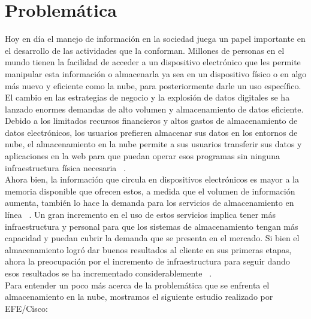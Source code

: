 \section{Problemática}
Hoy en día el manejo de información en la sociedad juega un papel importante en el desarrollo de las actividades que la conforman. Millones de personas en el mundo tienen la facilidad de acceder a un dispositivo electrónico que les permite manipular esta información o almacenarla ya sea en un dispositivo físico o en algo más nuevo y eficiente como la nube, para posteriormente darle un uso específico.
El cambio en las estrategias de negocio y la explosión de datos digitales se ha lanzado enormes demandas de alto volumen y almacenamiento de datos eficiente. Debido a los limitados recursos financieros y altos gastos de almacenamiento de datos electrónicos, los usuarios prefieren almacenar sus datos en los entornos de nube, el almacenamiento en la nube permite a sus usuarios transferir sus datos y aplicaciones en la web para que puedan operar esos programas sin ninguna infraestructura física necesaria ~\cite{Keelveedhi}.
\\
 Ahora bien, la información que circula en dispositivos electrónicos es mayor a la memoria disponible que ofrecen estos, a medida que el volumen de información aumenta, también lo hace la demanda para los servicios de almacenamiento en línea ~\cite{Bellare}. Un gran incremento en el uso de estos servicios implica tener más infraestructura y personal para que los sistemas de almacenamiento tengan más capacidad y puedan cubrir la demanda que se presenta en el mercado. Si bien el almacenamiento logró dar buenos resultados al cliente en sus primeras etapas, ahora la preocupación por el incremento de infraestructura para seguir dando esos resultados se ha incrementado considerablemente  ~\cite{Keelveedhi}.
\\ 

Para entender un poco más acerca de la problemática que se enfrenta el almacenamiento en la nube, mostramos el siguiente estudio realizado por EFE/Cisco:\\ 


